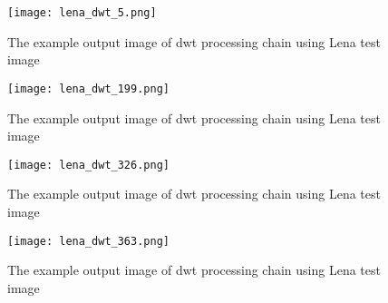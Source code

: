 \begin{figure}[!htb]
    \centering
    \texttt{[image: lena\_dwt\_5.png]}
    \caption{The example output image of dwt processing chain using Lena test image \cite{lena}}
    \label{fig:lena_dwt_5}
\end{figure}

\begin{figure}[!htb]
    \centering
    \texttt{[image: lena\_dwt\_199.png]}
    \caption{The example output image of dwt processing chain using Lena test image \cite{lena}}
    \label{fig:lena_dwt_199}
\end{figure}

\begin{figure}[!htb]
    \centering
    \texttt{[image: lena\_dwt\_326.png]}
    \caption{The example output image of dwt processing chain using Lena test image \cite{lena}}
    \label{fig:lena_dwt_326}
\end{figure}

\begin{figure}[!htb]
    \centering
    \texttt{[image: lena\_dwt\_363.png]}
    \caption{The example output image of dwt processing chain using Lena test image \cite{lena}}
    \label{fig:lena_dwt_363}
\end{figure}
